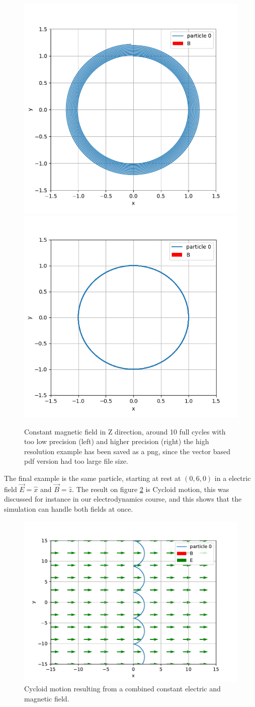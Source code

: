 \documentclass[a4paper,12pt,article]{memoir}
\begin{document}
\begin{figure}
\includegraphics[width=0.5\linewidth]{ex1.pdf}\includegraphics[width=0.5\linewidth]{ex1_1.png}
\caption{Constant magnetic field in Z direction, around 10 full cycles with too low precision (left) and higher precision (right) the high resolution example has been saved as a png, since the vector based pdf version had too large file size.}
\label{fig:ex1}
\end{figure}

The final example is the same particle, starting at rest at $(0,6,0)$ in a electric field $\vec{E}=\hat{x}$ and  $\vec{B}=\hat{z}$. The result on figure \ref{fig:ex2} is Cycloid motion, this was discussed for instance in our electrodynamics course, and this shows that the simulation can handle both fields at once.

\begin{figure}
\includegraphics[width=0.5\linewidth]{ex2.pdf}
\caption{Cycloid motion resulting from a combined constant electric and magnetic field.}
\label{fig:ex2}
\end{figure}

\printbibliography
\end{document}

